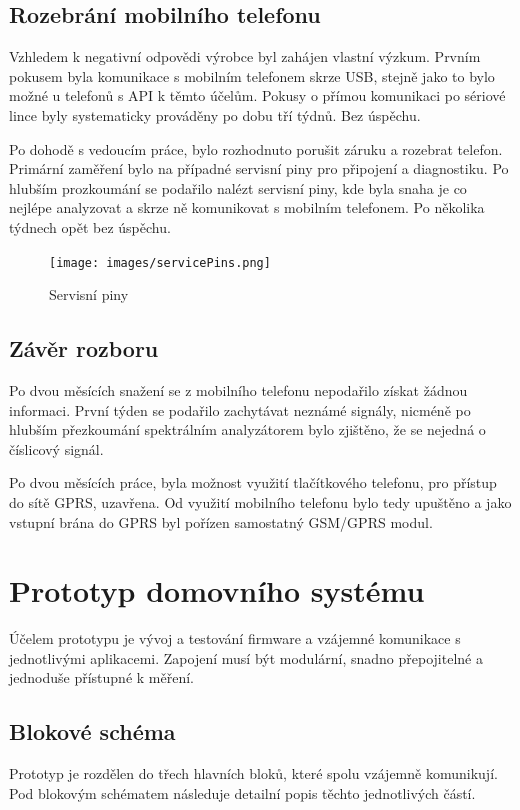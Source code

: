 \documentclass[FM,DP]{tulthesis}  %
\begin{document}
\subsection{Rozebrání mobilního telefonu}
Vzhledem k negativní odpovědi výrobce byl zahájen vlastní výzkum. Prvním pokusem byla komunikace s mobilním telefonem skrze USB, stejně jako to bylo možné u telefonů s API k těmto účelům. Pokusy o přímou komunikaci po sériové lince byly systematicky prováděny po dobu tří týdnů. Bez úspěchu.

Po dohodě s vedoucím práce, bylo rozhodnuto porušit záruku a rozebrat telefon. Primární zaměření bylo na případné servisní piny pro připojení a diagnostiku. Po hlubším prozkoumání se podařilo nalézt servisní piny, kde byla snaha je co nejlépe analyzovat a skrze ně komunikovat s mobilním telefonem. Po několika týdnech opět bez úspěchu.

\begin{figure}[H]
\begin{center}
\texttt{[image: images/servicePins.png]}
\caption{Servisní piny}
\label{image}
\end{center}
\end{figure}

\subsection{Závěr rozboru}
Po dvou měsících snažení se z mobilního telefonu nepodařilo získat žádnou informaci. První týden se podařilo zachytávat neznámé signály, nicméně po hlubším přezkoumání spektrálním analyzátorem bylo zjištěno, že se nejedná o číslicový signál.

Po dvou měsících práce, byla možnost využití tlačítkového telefonu, pro přístup do sítě GPRS, uzavřena. Od využití mobilního telefonu bylo tedy upuštěno a jako vstupní brána do GPRS byl pořízen samostatný GSM/GPRS modul.

\section{Prototyp domovního systému}
Účelem prototypu je vývoj a testování firmware a vzájemné komunikace s jednotlivými aplikacemi. Zapojení musí být modulární, snadno přepojitelné a jednoduše přístupné k měření.

\subsection{Blokové schéma}
Prototyp je rozdělen do třech hlavních bloků, které spolu vzájemně komunikují. Pod blokovým schématem následuje detailní popis těchto jednotlivých částí.
\end{document}
